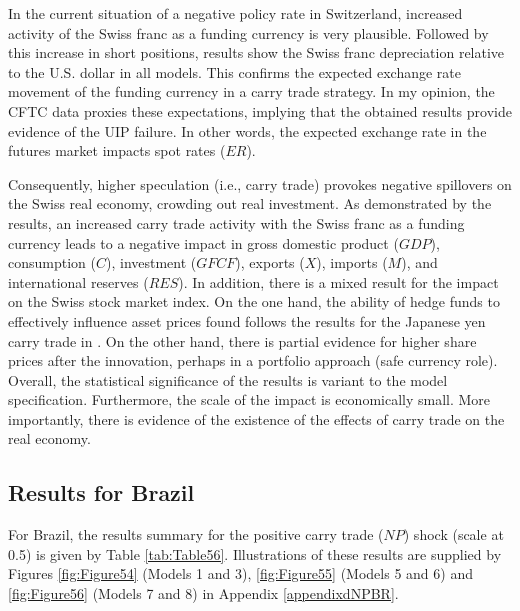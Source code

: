 \documentclass[a4paper, twoside]{templates/ociamthesis}
\begin{document}
In the current situation of a negative policy rate in Switzerland, increased activity of the Swiss franc as a funding currency is very plausible. Followed by this increase in short positions, results show the Swiss franc depreciation relative to the U.S. dollar in all models. This confirms the expected exchange rate movement of the funding currency in a carry trade strategy. In my opinion, the CFTC data proxies these expectations, implying that the obtained results provide evidence of the UIP failure. In other words, the expected exchange rate in the futures market impacts spot rates (\(ER\)).

Consequently, higher speculation (i.e., carry trade) provokes negative spillovers on the Swiss real economy, crowding out real investment. As demonstrated by the results, an increased carry trade activity with the Swiss franc as a funding currency leads to a negative impact in gross domestic product (\(GDP\)), consumption (\(C\)), investment (\(GFCF\)), exports (\(X\)), imports (\(M\)), and international reserves (\(RES\)). In addition, there is a mixed result for the impact on the Swiss stock market index. On the one hand, the ability of hedge funds to effectively influence asset prices found follows the results for the Japanese yen carry trade in \textcite{fong2013}. On the other hand, there is partial evidence for higher share prices after the innovation, perhaps in a portfolio approach (safe currency role). Overall, the statistical significance of the results is variant to the model specification. Furthermore, the scale of the impact is economically small. More importantly, there is evidence of the existence of the effects of carry trade on the real economy.

\hypertarget{fivethreetwo}{%
\subsection{Results for Brazil}\label{fivethreetwo}}

For Brazil, the results summary for the positive carry trade (\(NP\)) shock (scale at 0.5) is given by Table \ref{tab:Table56}. Illustrations of these results are supplied by Figures \ref{fig:Figure54} (Models 1 and 3), \ref{fig:Figure55} (Models 5 and 6) and \ref{fig:Figure56} (Models 7 and 8) in Appendix \ref{appendixdNPBR}.
\end{document}
